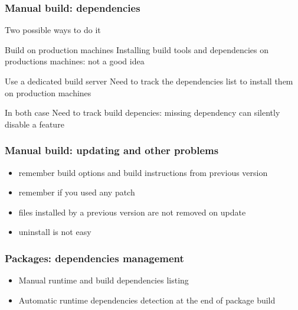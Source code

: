 \documentclass{beamer}
\begin{document}
\begin{frame}
  \frametitle{Manual build: dependencies}

  Two possible ways to do it

  \begin{block}{Build on production machines}
    Installing build tools and dependencies on productions machines: not a
    good idea
  \end{block}

  \begin{block}{Use a dedicated build server}
    Need to track the dependencies list to install them on production machines
  \end{block}

  \begin{block}{In both case}
    Need to track build depencies: missing dependency can silently disable
    a feature
  \end{block}
\end{frame}

\begin{frame}
  \frametitle{Manual build: updating and other problems}

  \begin{itemize}
    \item remember build options and build instructions from previous version
    \item remember if you used any patch
    \item files installed by a previous version are not removed on update
    \item uninstall is not easy
  \end{itemize}
\end{frame}

\begin{frame}
  \frametitle{Packages: dependencies management}
  \begin{itemize}
    \item Manual runtime and build dependencies listing
    \item Automatic runtime dependencies detection at the end of package
          build
  \end{itemize}
\end{frame}
\end{document}
